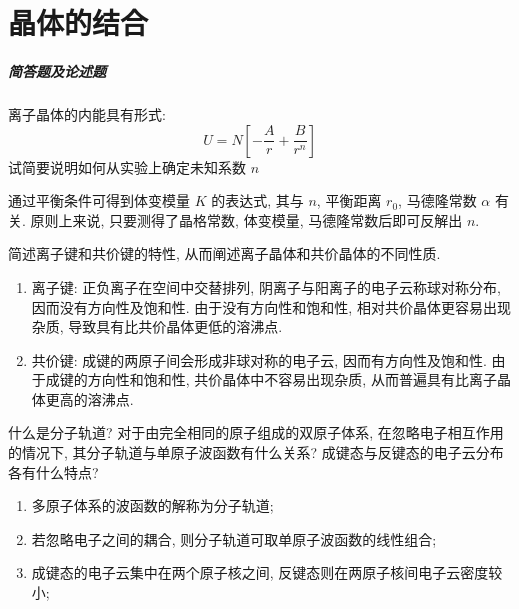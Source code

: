 \documentclass[UTF8]{ctexart}
\newenvironment{Answer}{}{}
\begin{document}
\section{晶体的结合}
    \subparagraph{简答题及论述题}
        \begin{Question}
            \item 离子晶体的内能具有形式:
                    \begin{equation*}
                        U = N \left[ - \dfrac{A}{r} + \dfrac{B}{r^n} \right]
                    \end{equation*}
                试简要说明如何从实验上确定未知系数 $n$

\begin{Answer}
    \begin{Solve}[Answer:]
        \hspace*{2em}通过平衡条件可得到体变模量 $K$ 的表达式, 其与 $n$, 平衡距离 $r_0$, 马德隆常数 $\alpha$ 有关. 原则上来说, 只要测得了晶格常数, 体变模量, 马德隆常数后即可反解出 $n$.
    \end{Solve}
\end{Answer}

            \item 简述离子键和共价键的特性, 从而阐述离子晶体和共价晶体的不同性质.

\begin{Answer}
    \begin{Solve}[Answer:]
        \vspace*{-1.7em}
        \begin{enumerate}
            \item 离子键: 正负离子在空间中交替排列, 阴离子与阳离子的电子云称球对称分布, 因而没有方向性及饱和性. 由于没有方向性和饱和性, 相对共价晶体更容易出现杂质, 导致具有比共价晶体更低的溶沸点.
            \item 共价键: 成键的两原子间会形成非球对称的电子云, 因而有方向性及饱和性. 由于成键的方向性和饱和性, 共价晶体中不容易出现杂质, 从而普遍具有比离子晶体更高的溶沸点.
        \end{enumerate}
    \end{Solve}
\end{Answer}

            \item 什么是分子轨道? 对于由完全相同的原子组成的双原子体系, 在忽略电子相互作用的情况下, 其分子轨道与单原子波函数有什么关系? 成键态与反键态的电子云分布各有什么特点?

\begin{Answer}
    \begin{Solve}[Answer:]
        \vspace*{-1.7em}
        \begin{enumerate}
            \item 多原子体系的波函数的解称为分子轨道;
            \item 若忽略电子之间的耦合, 则分子轨道可取单原子波函数的线性组合;
            \item 成键态的电子云集中在两个原子核之间, 反键态则在两原子核间电子云密度较小;
        \end{enumerate}
    \end{Solve}
\end{Answer}


\end{Question}
\end{document}
